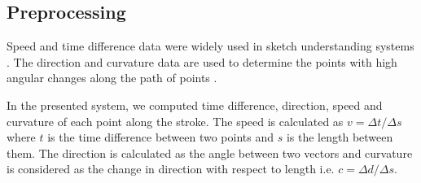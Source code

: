 \documentclass[a4paper,10pt]{IEEEconf}
\begin{document}
\subsection{Preprocessing}
\label{Prepross}
 Speed and time difference data were widely used in sketch understanding systems \cite{earlyprocess}.  The direction and curvature data are used to determine the points with high angular changes along the path of points \cite{meanshift10}.  
 
 In the presented system, we computed time difference, direction, speed and curvature of each point along the stroke. The speed is calculated as  $v=\Delta t/\Delta s$ where $t$ is the time difference between two points and $s$ is the length between them. The direction is calculated as the angle between two vectors and curvature is considered as the change in direction with respect to length i.e. $c= \Delta d/\Delta s$.
 
 
\end{document}
